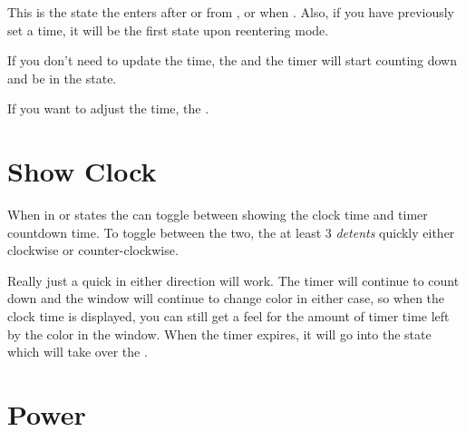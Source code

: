 This is the state the  enters after  or from ,
 or  when .  Also, if you have previously set a
time, it will be the first state upon reentering  mode.

\par\medskip

If you don't need to update the time,  the  and the timer will
start counting down and be in the  state.


If you want to adjust the time,  the .


\section{Show Clock}

When in  or  states the  can toggle between showing the
clock time and timer countdown time. To toggle between the two,  the
 at least \num{3} \textit{detents} quickly either clockwise or
counter-clockwise.


Really just a quick  in either direction will work.  The timer will
continue to count down and the  window will continue to change color in
either case, so when the clock time is displayed, you can still get a feel for
the amount of timer time left by the color in the  window.  When the
timer expires, it will go into the  state which will take over the
.

\section{Power}

